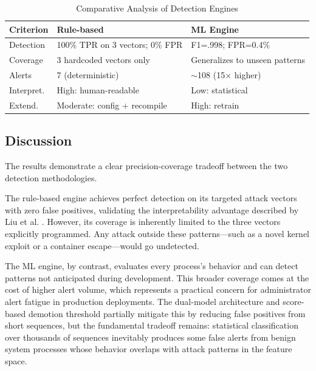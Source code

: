 \documentclass[journal]{./IEEEtran}
\begin{document}
\begin{table}[H]
    \centering
    \footnotesize
    \setlength{\tabcolsep}{3pt}
    \renewcommand{\arraystretch}{1.1}
    \caption{Comparative Analysis of Detection Engines}
    \begin{tabular}{|p{1.5cm}|p{2.5cm}|p{2.5cm}|}
        \hline
        \textbf{Criterion} & \textbf{Rule-based} & \textbf{ML Engine} \\ \hline
        Detection & 100\% TPR on 3 vectors; 0\% FPR & F1=.998; FPR=0.4\% \\ \hline
        Coverage & 3 hardcoded vectors only & Generalizes to unseen patterns \\ \hline
        Alerts & 7 (deterministic) & $\sim$108 (15$\times$ higher) \\ \hline
        Interpret. & High: human-readable & Low: statistical \\ \hline
        Extend. & Moderate: config + recompile & High: retrain \\ \hline
    \end{tabular}
    \label{tab:comparison}
\end{table}

\subsection{Discussion}

The results demonstrate a clear precision-coverage tradeoff between the two detection methodologies.

The rule-based engine achieves perfect detection on its targeted attack vectors with zero false positives, validating the interpretability advantage described by Liu et al. \cite{liu2021}. However, its coverage is inherently limited to the three vectors explicitly programmed. Any attack outside these patterns---such as a novel kernel exploit or a container escape---would go undetected.

The ML engine, by contrast, evaluates every process's behavior and can detect patterns not anticipated during development. This broader coverage comes at the cost of higher alert volume, which represents a practical concern for administrator alert fatigue in production deployments. The dual-model architecture and score-based demotion threshold partially mitigate this by reducing false positives from short sequences, but the fundamental tradeoff remains: statistical classification over thousands of sequences inevitably produces some false alerts from benign system processes whose behavior overlaps with attack patterns in the feature space.
\end{document}

